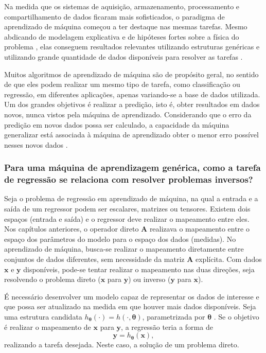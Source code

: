 Na medida que os sistemas de aquisição, armazenamento, processamento e compartilhamento de dados ficaram mais sofisticados, o paradigma de aprendizado de máquina começou a ter destaque nas mesmas tarefas. Mesmo abdicando de modelagem explicativa e de  hipóteses fortes sobre a física do problema \cite{Kording2018}, elas conseguem resultados relevantes utilizando estruturas genéricas e utilizando grande quantidade de dados disponíveis para resolver as tarefas  \cite{goodfellow2016deep}. 

Muitos algoritmos de aprendizado de máquina são de propósito geral, no sentido de que eles podem realizar um mesmo tipo de tarefa, como classificação ou regressão, em diferentes aplicações, apenas variando-se a base de dados utilizada. Um dos grandes objetivos é realizar a predição, isto é, obter resultados em dados novos, nunca vistos pela máquina de aprendizado. Considerando que o erro da predição em novos dados possa ser calculado, a capacidade da máquina generalizar está associada à máquina de aprendizado obter o menor erro possível nesses novos dados  \cite[pág. 429]{vapnik1998statistical}. 


\subsubsection{Para uma máquina de aprendizagem genérica, como a tarefa de regressão se relaciona com resolver problemas inversos?}

Seja o problema de regressão em aprendizado de máquina, na qual a entrada e a saída de um regressor podem ser escalares, matrizes ou tensores. Existem dois espaços (entrada e saída) e o regressor deve realizar o mapeamento entre eles. Nos capítulos anteriores, o operador direto $\mathbf{A}$ realizava o mapeamento entre o espaço dos parâmetros do modelo para o espaço dos dados (medidas). No aprendizado de máquina, busca-se realizar o mapeamento diretamente entre conjuntos de dados diferentes, sem necessidade da matriz $\mathbf{A}$ explícita. Com dados $\mathbf{x}$ e $\mathbf{y}$ disponíveis, pode-se tentar realizar o mapeamento nas duas direções, seja resolvendo o problema direto ($\mathbf{x}$ para $\mathbf{y}$) ou  inverso ($\mathbf{y}$ para $\mathbf{x}$). 

É necessário desenvolver um modelo capaz de representar os dados de interesse e que possa ser atualizado na medida em que houver mais dados disponíveis. Seja uma estrutura candidata $h_{\bm{\theta}}( \cdot) = h(\cdot, \bm{\theta})$, parametrizada por $\bm{\theta}$ \cite[Seção 8.2]{Deisenroth2020}. Se o objetivo é realizar o mapeamento de $\mathbf{x}$ para $\mathbf{y}$, a regressão teria a forma de 
\begin{equation}
\mathbf{y} = h_{\bm{\theta}}(\mathbf{x}),
\label{eq:NNinf}
\end{equation}
realizando a tarefa desejada. Neste caso, a solução de um problema direto. 

